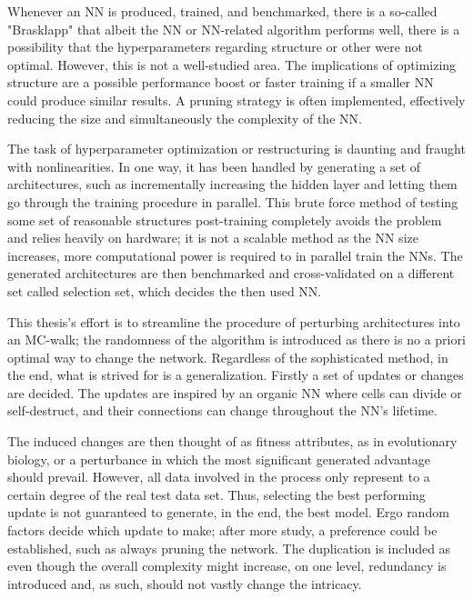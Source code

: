Whenever an NN is produced, trained, and benchmarked, there is a so-called "Brasklapp" that albeit the NN or NN-related algorithm performs well, there is a possibility that the hyperparameters regarding structure or other were not optimal. However, this is not a well-studied area. The implications of optimizing structure are a possible performance boost or faster training if a smaller NN could produce similar results. A pruning strategy is often implemented, effectively reducing the size and simultaneously the complexity of the NN.  

The task of hyperparameter optimization or restructuring is daunting and fraught with nonlinearities. In one way, it has been handled by generating a set of architectures, such as incrementally increasing the hidden layer and letting them go through the training procedure in parallel. This brute force method of testing some set of reasonable structures post-training completely avoids the problem and relies heavily on hardware; it is not a scalable method as the NN size increases, more computational power is required to in parallel train the NNs. The generated architectures are then benchmarked and cross-validated on a different set called selection set, which decides the then used NN. 

This thesis's effort is to streamline the procedure of perturbing architectures into an MC-walk; the randomness of the algorithm is introduced as there is no a priori optimal way to change the network. Regardless of the sophisticated method, in the end, what is strived for is a generalization. Firstly a set of updates or changes are decided. The updates are inspired by an organic NN where cells can divide or self-destruct, and their connections can change throughout the NN's lifetime. 

The induced changes are then thought of as fitness attributes, as in evolutionary biology, or a perturbance in which the most significant generated advantage should prevail. However, all data involved in the process only represent to a certain degree of the real test data set. Thus, selecting the best performing update is not guaranteed to generate, in the end, the best model. Ergo random factors decide which update to make; after more study, a preference could be established, such as always pruning the network. The duplication is included as even though the overall complexity might increase, on one level, redundancy is introduced and, as such, should not vastly change the intricacy. 

